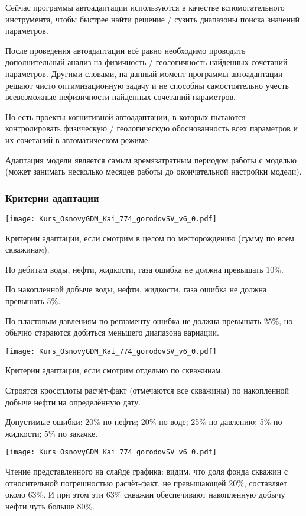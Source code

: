 \documentclass[main.tex]{subfiles}
\begin{document}
Сейчас программы автоадаптации используются в качестве вспомогательного инструмента, чтобы быстрее найти решение / сузить диапазоны поиска значений параметров.

После проведения автоадаптации всё равно необходимо проводить дополнительный анализ на физичность / геологичность найденных сочетаний параметров.
Другими словами, на данный момент программы автоадаптации решают чисто оптимизационную задачу и не способны самостоятельно учесть всевозможные нефизичности найденных сочетаний параметров.

Но есть проекты когнитивной автоадаптации, в которых пытаются контролировать физическую / геологическую обоснованность всех параметров и их сочетаний в автоматическом режиме.

Адаптация модели является самым времязатратным периодом работы с моделью (может занимать несколько месяцев работы до окончательной настройки модели).

\subsubsection{Критерии адаптации}

\texttt{[image: Kurs\_OsnovyGDM\_Kai\_774\_gorodovSV\_v6\_0.pdf]}

Критерии адаптации, если смотрим в целом по месторождению (сумму по всем скважинам).

По дебитам воды, нефти, жидкости, газа ошибка не должна превышать 10\%.

По накопленной добыче воды, нефти, жидкости, газа ошибка не должна превышать 5\%.

По пластовым давлениям по регламенту ошибка не должна превышать 25\%, но обычно стараются добиться меньшего диапазона вариации.

\texttt{[image: Kurs\_OsnovyGDM\_Kai\_774\_gorodovSV\_v6\_0.pdf]}

Критерии адаптации, если смотрим отдельно по скважинам.

Строятся кроссплоты расчёт-факт (отмечаются все скважины) по накопленной добыче нефти на определённую дату.

Допустимые ошибки: 20\% по нефти; 20\% по воде; 25\% по давлению; 5\% по жидкости; 5\% по закачке.

\texttt{[image: Kurs\_OsnovyGDM\_Kai\_774\_gorodovSV\_v6\_0.pdf]}

Чтение представленного на слайде графика: видим, что доля фонда скважин с относительной погрешностью расчёт-факт, не превышающей 20\%, составляет около 63\%. И при этом эти 63\% скважин обеспечивают накопленную добычу нефти чуть больше 80\%.\\
\end{document}
